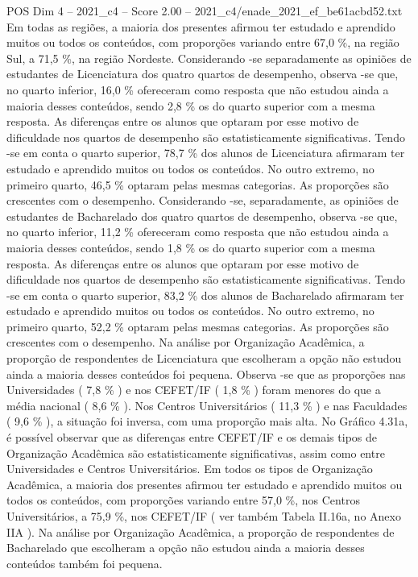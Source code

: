 \begin{textsample}{POS Dim 4 – 2021\_c4 – Score 2.00 – 2021\_c4/enade\_2021\_ef\_be61acbd52.txt}
Em todas as regiões, a maioria dos presentes afirmou ter estudado e aprendido muitos ou todos os conteúdos, com proporções variando entre 67,0 \%, na região Sul, a 71,5 \%, na região Nordeste.
Considerando -se separadamente as opiniões de estudantes de Licenciatura dos quatro quartos de desempenho, observa -se que, no quarto inferior, 16,0 \% ofereceram como resposta que não estudou ainda a maioria desses conteúdos, sendo 2,8 \% os do quarto superior com a mesma resposta.
As diferenças entre os alunos que optaram por esse motivo de dificuldade nos quartos de desempenho são estatisticamente significativas.
Tendo -se em conta o quarto superior, 78,7 \% dos alunos de Licenciatura afirmaram ter estudado e aprendido muitos ou todos os conteúdos.
No outro extremo, no primeiro quarto, 46,5 \% optaram pelas mesmas categorias.
As proporções são crescentes com o desempenho.
Considerando -se, separadamente, as opiniões de estudantes de Bacharelado dos quatro quartos de desempenho, observa -se que, no quarto inferior, 11,2 \% ofereceram como resposta que não estudou ainda a maioria desses conteúdos, sendo 1,8 \% os do quarto superior com a mesma resposta.
As diferenças entre os alunos que optaram por esse motivo de dificuldade nos quartos de desempenho são estatisticamente significativas.
Tendo -se em conta o quarto superior, 83,2 \% dos alunos de Bacharelado afirmaram ter estudado e aprendido muitos ou todos os conteúdos.
No outro extremo, no primeiro quarto, 52,2 \% optaram pelas mesmas categorias.
As proporções são crescentes com o desempenho.
Na análise por Organização Acadêmica, a proporção de respondentes de Licenciatura que escolheram a opção não estudou ainda a maioria desses conteúdos foi pequena.
Observa -se que as proporções nas Universidades ( 7,8 \% ) e nos CEFET/IF ( 1,8 \% ) foram menores do que a média nacional ( 8,6 \% ).
Nos Centros Universitários ( 11,3 \% ) e nas Faculdades ( 9,6 \% ), a situação foi inversa, com uma proporção mais alta.
No Gráfico 4.31a, é possível observar que as diferenças entre CEFET/IF e os demais tipos de Organização Acadêmica são estatisticamente significativas, assim como entre Universidades e Centros Universitários.
Em todos os tipos de Organização Acadêmica, a maioria dos presentes afirmou ter estudado e aprendido muitos ou todos os conteúdos, com proporções variando entre 57,0 \%, nos Centros Universitários, a 75,9 \%, nos CEFET/IF ( ver também Tabela II.16a, no Anexo IIA ).
Na análise por Organização Acadêmica, a proporção de respondentes de Bacharelado que escolheram a opção não estudou ainda a maioria desses conteúdos também foi pequena.

\end{textsample}

